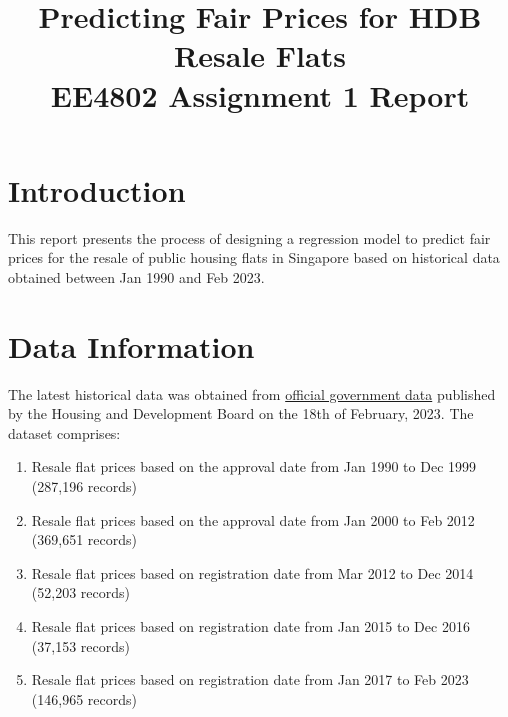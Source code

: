 \documentclass[[12pt,conference]{IEEEtran}
\begin{document}
\lstset{style=mystyle}


\title{\huge Predicting Fair Prices for HDB Resale Flats \\ \LARGE EE4802 Assignment 1 Report }

\author{
\vspace{-3em}}

\maketitle

\section{Introduction}
This report presents the process of designing a regression model to predict fair prices for the resale of public housing flats in Singapore based on historical data obtained between Jan 1990 and Feb 2023.


\section{Data Information}
The latest historical data was obtained from \href{https://data.gov.sg/dataset/resale-flat-prices}{official government data} published by the Housing and Development Board on the 18th of February, 2023. 
The dataset comprises:
\begin{enumerate}
    \item Resale flat prices based on the approval date from Jan 1990 to Dec 1999 (287,196 records)
    \item Resale flat prices based on the approval date from Jan 2000 to Feb 2012 (369,651 records)
    \item Resale flat prices based on registration date from Mar 2012 to Dec 2014 (52,203 records)
    \item Resale flat prices based on registration date from Jan 2015 to Dec 2016 (37,153 records)
    \item Resale flat prices based on registration date from Jan 2017 to Feb 2023 (146,965 records)
\end{enumerate}
\end{document}
